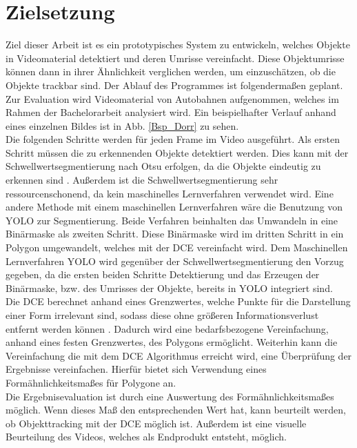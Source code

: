 \section{Zielsetzung}{ 
Ziel dieser Arbeit ist es ein prototypisches System zu entwickeln, welches Objekte in Videomaterial detektiert und deren Umrisse vereinfacht. Diese Objektumrisse können dann in ihrer Ähnlichkeit verglichen werden, um einzuschätzen, ob die Objekte trackbar sind. Der Ablauf des Programmes ist folgendermaßen geplant. \\ 
Zur Evaluation wird Videomaterial von Autobahnen aufgenommen, welches im Rahmen der Bachelorarbeit analysiert wird. Ein beispielhafter Verlauf anhand eines einzelnen Bildes ist in Abb. \ref{Bsp_Dorr} zu sehen. \\
Die folgenden Schritte werden für jeden Frame im Video ausgeführt. 
Als ersten Schritt müssen die zu erkennenden Objekte detektiert werden. Dies kann mit der Schwellwertsegmentierung nach Otsu erfolgen, da die Objekte eindeutig zu erkennen sind \citep{Otsu1979}. Außerdem ist die Schwellwertsegmentierung sehr ressourcenschonend, da kein maschinelles Lernverfahren verwendet wird. Eine andere Methode mit einem maschinellen Lernverfahren wäre die Benutzung von YOLO zur Segmentierung. Beide Verfahren beinhalten das Umwandeln in eine Binärmaske als zweiten Schritt. Diese Binärmaske wird im dritten Schritt in ein Polygon umgewandelt, welches mit der DCE vereinfacht wird. Dem Maschinellen Lernverfahren YOLO wird gegenüber der Schwellwertsegmentierung den Vorzug gegeben, da die ersten beiden Schritte Detektierung und das Erzeugen der Binärmaske, bzw. des Umrisses der Objekte, bereits in YOLO integriert sind.\\
Die DCE berechnet anhand eines Grenzwertes, welche Punkte für die Darstellung einer Form irrelevant sind, sodass diese ohne größeren Informationsverlust entfernt werden können \citep{Barkowsky2000}. Dadurch wird eine bedarfsbezogene Vereinfachung, anhand eines festen Grenzwertes, des Polygons ermöglicht. 
Weiterhin kann die Vereinfachung die mit dem DCE Algorithmus erreicht wird, eine Überprüfung der Ergebnisse vereinfachen. Hierfür bietet sich Verwendung eines Formähnlichkeitsmaßes für Polygone an. \\
Die Ergebnisevaluation ist durch eine Auswertung des Formähnlichkeitsmaßes möglich. Wenn dieses Maß den entsprechenden Wert hat, kann beurteilt werden, ob Objekttracking mit der DCE möglich ist. Außerdem ist eine visuelle Beurteilung des Videos, welches als Endprodukt entsteht, möglich.\\}
